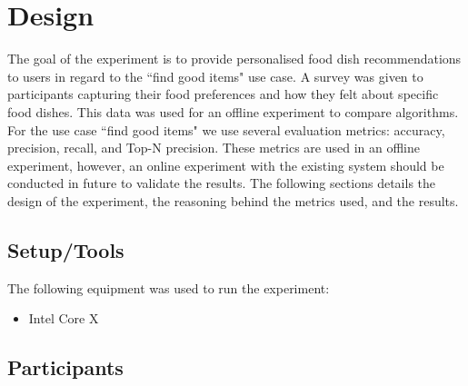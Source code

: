 

\section{Design}

The goal of the experiment is to provide personalised food dish recommendations to users in regard to the ``find good items" use case. A survey was given to participants capturing their food preferences and how they felt about specific food dishes. This data was used for an offline experiment to compare algorithms. For the use case ``find good items" we use several evaluation metrics: accuracy, precision, recall, and Top-N precision. These metrics are used in an offline experiment, however, an online experiment with the existing system should be conducted in future to validate the results. 
The following sections details the design of the experiment, the reasoning behind the metrics used, and the results. 

\subsection{Setup/Tools}
The following equipment was used to run the experiment:
\begin{itemize}
	\item{Intel Core X}
\end{itemize}

\subsection{Participants}

